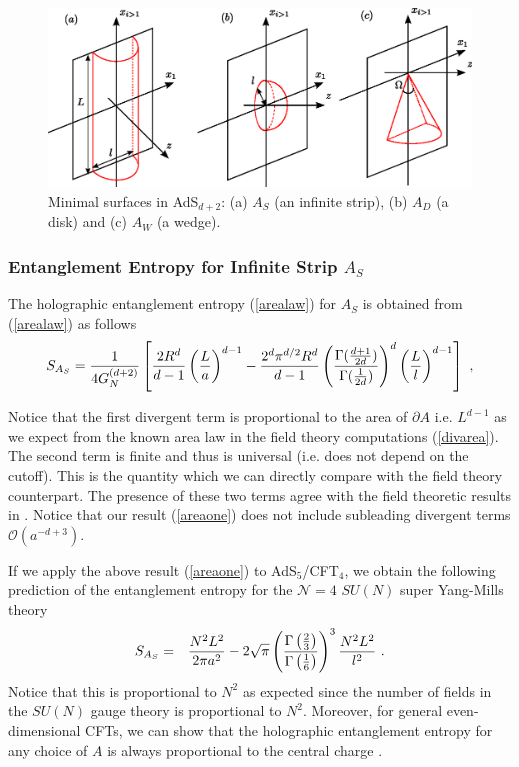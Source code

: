 \documentclass[12pt]{article}
\def\frac#1#2{{#1\over #2}}
\def\s{\sqrt}
\def\de{\partial}
\def\f {\frac}
\def\frac#1#2{{#1\over #2}}
\def\s{\sqrt}
\def\be{\begin{equation}}
\def\ee{\end{equation}}
\def\ba{\begin{eqnarray}}
\def\ea{\end{eqnarray}}
\begin{document}
\begin{figure}
\begin{center}
\includegraphics[width=15cm,clip]{min_surfs.eps}
\end{center}
\caption{
\label{fig: min_surf}
Minimal surfaces in
AdS$_{d+2}$: (a) $A_S$ (an infinite strip),
(b) $A_D$ (a disk)
and (c)  $A_W$ (a wedge).
}
\end{figure}

\subsubsection{Entanglement Entropy for Infinite Strip $A_S$}
\hspace{5mm}
The holographic entanglement entropy (\ref{arealaw}) for $A_S$ is obtained
from (\ref{arealaw}) as follows \cite{RuTaL}
\be
S_{A_{S}}=\f{1}{4G^{(d+2)}_{N}}\left[\f{2R^d}{d-1}\left(\f{L}{a}\right)^{d-1}
-\f{2^d \pi^{d/2} R^{d}}{d-1}\left(\f{\Gamma(\f{d+1}{2d})}
{\Gamma(\f{1}{2d})}\right)^{d} \left(\f{L}{l}\right)^{ d-1}\right] \ ,
\label{areaone} \ee

Notice that the first divergent term is proportional to the area of
$\de A$ i.e. $L^{d-1}$ as we expect from the known area law in the
field theory computations (\ref{divarea}). The second term is finite
and thus is universal (i.e. does not depend on the cutoff). This is
the quantity which we can directly compare with the field theory
counterpart. The presence of these two terms agree with the field theoretic
results in \cite{Casini05b,RuTaL}. Notice that our result (\ref{areaone})
does not include subleading divergent terms ${\mathcal{O}}(a^{-d+3})$.

If we apply the above result (\ref{areaone}) to AdS$_5$/CFT$_4$,
we obtain the
following prediction of
the entanglement entropy
for the
${\mathcal N}=4$
$SU(N)$ super Yang-Mills theory
\ba S_{A_S}&=&\f{N^2L^2}{2\pi a^2}-2\s{\pi}
\left(\f{\Gamma\left(\f23\right)}{\Gamma\left(\f16\right)}
\right)^3\f{N^2L^2}{l^2} \ . \label{entrodthe} \ea Notice that this
is proportional to $N^2$ as expected since the number of fields in
the $SU(N)$ gauge theory is proportional to $N^2$. Moreover, for general even-dimensional
CFTs, we can show that
the holographic entanglement entropy for any choice of $A$ is always proportional to
the central charge \cite{RuTaL,Nishioka:2007zz}.
\end{document}
